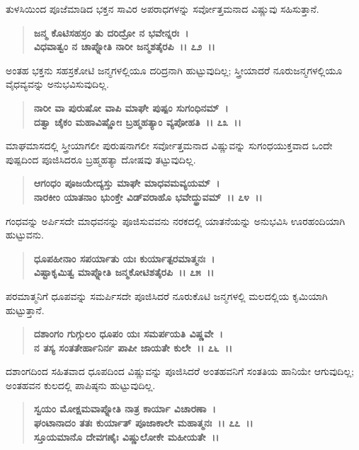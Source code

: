 ತುಳಸಿಯಿಂದ ಪೂಜೆಮಾಡಿದ ಭಕ್ತನ ಸಾವಿರ ಅಪರಾಧಗಳನ್ನು ಸರ್ವೋತ್ತಮನಾದ ವಿಷ್ಣುವು ಸಹಿಸುತ್ತಾನೆ.

\begin{verse}
\textbf{ಜನ್ಮ ಕೊಟಿಸಹಸ್ರಂ ತು ದರಿದ್ರೋ ನ ಭವೇನ್ನರಃ~।}\\\textbf{ವಿಧವಾತ್ವಂ ನ ಚಾಪ್ನೋತಿ ನಾರೀ ಜನ್ಮಶತೈರಪಿ~।। ೭೨~।।}
\end{verse}

ಅಂತಹ ಭಕ್ತನು ಸಹಸ್ರಕೋಟಿ ಜನ್ಮಗಳಲ್ಲಿಯೂ ದರಿದ್ರನಾಗಿ ಹುಟ್ಟುವುದಿಲ್ಲ; ಸ್ತ್ರೀಯಾದರೆ ನೂರುಜನ್ಮಗಳಲ್ಲಿಯೂ ವೈಧವ್ಯವನ್ನು ಅನುಭವಿಸುವುದಿಲ್ಲ.

\begin{verse}
\textbf{ನಾರೀ ವಾ ಪುರುಷೋ ವಾಪಿ ಮಾಘೇ ಪುಷ್ಪಂ ಸುಗಂಧಿನಮ್~।}\\\textbf{ದತ್ವಾ ಚೈಕಂ ಮಹಾವಿಷ್ಣೋಃ ಬ್ರಹ್ಮಹತ್ಯಾಂ ವ್ಯಪೋಹತಿ~।। ೭೩~।।}
\end{verse}

ಮಾಘಮಾಸದಲ್ಲಿ ಸ್ತ್ರೀಯಾಗಲೀ ಪುರುಷನಾಗಲೀ ಸರ್ವೋತ್ತಮನಾದ ವಿಷ್ಣುವನ್ನು ಸುಗಂಧಯುಕ್ತವಾದ ಒಂದೇ ಪುಷ್ಪದಿಂದ ಪೂಜಿಸಿದರೂ ಬ್ರಹ್ಮಹತ್ಯಾ ದೋಷವು ತಟ್ಟುವುದಿಲ್ಲ.

\begin{verse}
\textbf{ಆಗಂಧಂ ಪೂಜಯೇದ್ಯಸ್ತು ಮಾಘೇ ಮಾಧವಮವ್ಯಯಮ್~।}\\\textbf{ನಾರಕೀಂ ಯಾತನಾಂ ಭುಂಕ್ತೇ ವಿಡ್‌ವರಾಹೊ ಭವೇದ್ಧ್ರುವಮ್~।। ೭೪~।।}
\end{verse}

ಗಂಧವನ್ನು ಅರ್ಪಿಸದೇ ಮಾಧವನನ್ನು ಪೂಜಿಸುವವನು ನರಕದಲ್ಲಿ ಯಾತನೆಯನ್ನು ಅನುಭವಿಸಿ ಊರಹಂದಿಯಾಗಿ ಹುಟ್ಟುವನು.

\begin{verse}
\textbf{ಧೂಪಹೀನಾಂ ಸಪರ್ಯಾತು ಯಃ ಕುರ್ಯಾತ್ಪರಮಾತ್ಮನಃ~।}\\\textbf{ವಿಷ್ಟಾಕೃಮಿತ್ವ ಮಾಪ್ನೋತಿ ಜನ್ಮಕೋಟಿಶತೈರಪಿ~।। ೭೫~।।}
\end{verse}

ಪರಮಾತ್ಮನಿಗೆ ಧೂಪವನ್ನು ಸಮರ್ಪಿಸದೇ ಪೂಜಿಸಿದರೆ ನೂರುಕೊಟಿ ಜನ್ಮಗಳಲ್ಲಿ ಮಲದಲ್ಲಿಯ ಕೃಮಿಯಾಗಿ ಹುಟ್ಟುತ್ತಾನೆ.

\begin{verse}
\textbf{ದಶಾಂಗಂ ಗುಗ್ಗುಲಂ ಧೂಪಂ ಯಃ ಸಮರ್ಪಯತಿ ವಿಷ್ಣವೇ~।}\\\textbf{ನ ತಸ್ಯ ಸಂತತೇರ್ಹಾನಿರ್ನ ಪಾಪೀ ಜಾಯತೇ ಕುಲೇ~।। ೭೬~।।}
\end{verse}

ದಶಾಂಗದಿಂದ ಸಹಿತವಾದ ಧೂಪದಿಂದ ವಿಷ್ಣುವನ್ನು ಪೂಜಿಸಿದರೆ ಅಂತಹವನಿಗೆ ಸಂತತಿಯ ಹಾನಿಯೇ ಆಗುವುದಿಲ್ಲ; ಅಂತಹವನ ಕುಲದಲ್ಲಿ ಪಾಪಿಷ್ಠನು ಹುಟ್ಟುವುದಿಲ್ಲ.

\begin{verse}
\textbf{ಸ್ವಯಂ ಮೋಕ್ಷಮವಾಪ್ನೋತಿ ನಾತ್ರ ಕಾರ್ಯಾ ವಿಚಾರಣಾ~।}\\\textbf{ಘಂಟಾನಾದಂ ತತಃ ಕುರ್ಯಾತ್ ಪೂಜಾಕಾಲೇ ಮಹಾತ್ಮನಃ~।। ೭೭~।।}\\\textbf{ಸ್ತೂಯಮಾನೊ ದೇವಗಣೈಃ ವಿಷ್ಣುಲೋಕೇ ಮಹೀಯತೇ~।।}
\end{verse}

